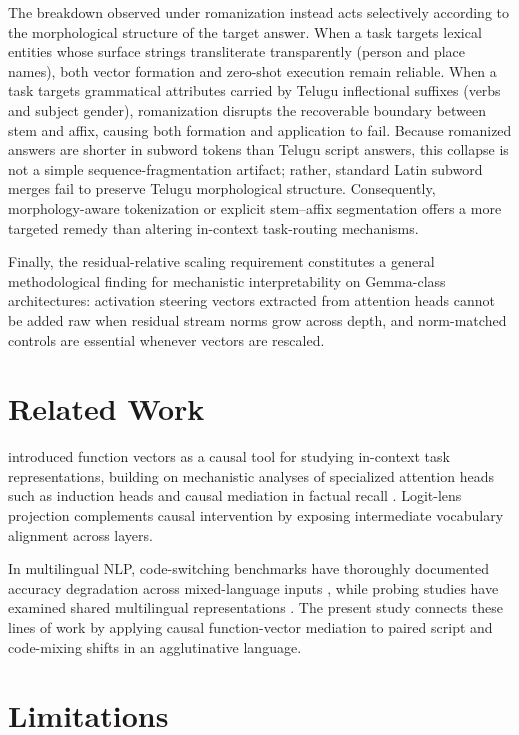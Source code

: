 \documentclass[11pt]{article}
\begin{document}
The breakdown observed under romanization instead acts selectively according to
the morphological structure of the target answer. When a task targets
lexical entities whose surface strings transliterate transparently (person and
place names), both vector formation and zero-shot execution remain reliable.
When a task targets grammatical attributes carried by Telugu inflectional
suffixes (verbs and subject gender), romanization disrupts the recoverable
boundary between stem and affix, causing both formation and application to
fail. Because romanized answers are shorter in subword tokens than Telugu
script answers, this collapse is not a simple sequence-fragmentation artifact;
rather, standard Latin subword merges fail to preserve Telugu morphological
structure. Consequently, morphology-aware tokenization or explicit
stem--affix segmentation offers a more targeted remedy than altering
in-context task-routing mechanisms.

Finally, the residual-relative scaling requirement constitutes a general
methodological finding for mechanistic interpretability on Gemma-class
architectures: activation steering vectors extracted from attention heads
cannot be added raw when residual stream norms grow across depth, and
norm-matched controls are essential whenever vectors are rescaled.

\section{Related Work}

\citet{todd2024function} introduced function vectors as a causal tool for
studying in-context task representations, building on mechanistic analyses of
specialized attention heads such as induction heads \cite{olsson2022context}
and causal mediation in factual recall \cite{meng2022rome}. Logit-lens
projection \cite{nostalgebraist2020logitlens} complements causal intervention
by exposing intermediate vocabulary alignment across layers.

In multilingual NLP, code-switching benchmarks have thoroughly documented
accuracy degradation across mixed-language inputs
\cite{sitaram2019survey,khanuja2020gluecos}, while probing studies have
examined shared multilingual representations
\cite{pires2019multilingual,conneau2020emerging}. The present study connects
these lines of work by applying causal function-vector mediation to paired
script and code-mixing shifts in an agglutinative language.

\section{Limitations}
\end{document}
